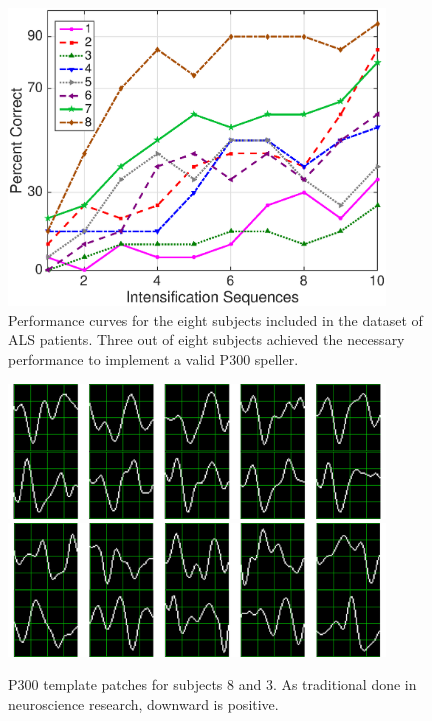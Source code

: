 \documentclass[utf8]{frontiersSCNS} %
\begin{document}
\begin{figure}[h!]
\centering
\includegraphics[width=10cm]{performance2.eps}
\caption{Performance curves for the eight subjects included in the dataset of ALS patients.  Three out of eight subjects achieved the necessary performance to implement a valid P300 speller.}
\label{fig:performance}
\end{figure}


\begin{figure}[h!]
\centering
\includegraphics[width=10cm]{subject8.png}\label{subject8}
\includegraphics[width=10cm]{subject3.png}\label{subject3}
\caption{P300 template patches for subjects 8 and 3. As traditional done in neuroscience research, downward is positive. }
\label{fig:p300templates}
\end{figure}
\end{document}
